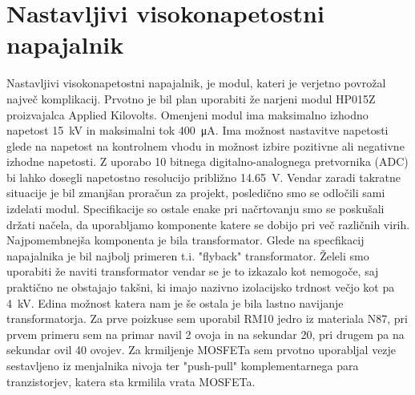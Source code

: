 \documentclass[a4paper,twoside,openright,12pt,slovene]{book}
\begin{document}
\section{Nastavljivi visokonapetostni napajalnik}

 Nastavljivi visokonapetostni napajalnik, je modul, kateri je verjetno povrožal največ komplikacij. Prvotno je bil plan uporabiti že narjeni modul HP015Z proizvajalca Applied Kilovolts. Omenjeni modul ima maksimalno izhodno napetost \SI{15}{\kilo\volt} in maksimalni tok \SI{400}{\micro\ampere}. Ima možnost nastavitve napetosti glede na napetost na kontrolnem vhodu in možnost izbire pozitivne ali negativne izhodne napetosti. Z uporabo 10 bitnega digitalno-analognega pretvornika (ADC) bi lahko dosegli napetostno resolucijo približno \SI{14,65}{\volt}.
Vendar zaradi takratne situacije je bil zmanjšan proračun za projekt, posledično smo se odločili sami izdelati modul. Specifikacije so ostale enake pri načrtovanju smo se poskušali držati načela, da uporabljamo komponente katere se dobijo pri več različnih virih. Najpomembnejša komponenta je bila transformator. Glede na specfikacij napajalnika je bil najbolj primeren t.i. "flyback" transformator. Želeli smo uporabiti že naviti transformator vendar se je to izkazalo kot nemogoče, saj praktično ne obstajajo takšni, ki imajo nazivno izolacijsko trdnost večjo kot pa \SI{4}{\kilo\volt}. 
Edina možnost katera nam je še ostala je bila lastno navijanje transformatorja. Za prve poizkuse sem uporabil RM10 jedro iz materiala N87, pri prvem primeru sem na primar navil 2 ovoja in na sekundar 20, pri drugem pa na sekundar ovil 40 ovojev. %
Za krmiljenje MOSFETa sem prvotno uporabljal vezje sestavljeno iz menjalnika nivoja ter "push-pull" komplementarnega para tranzistorjev, katera sta krmilila vrata MOSFETa.
\end{document}
